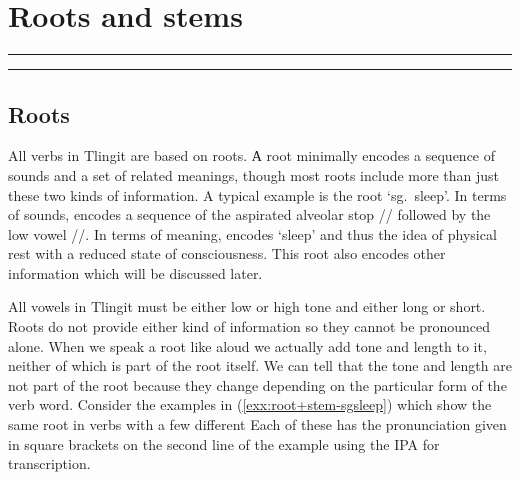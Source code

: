 
\resetexcnt
\chapter{Roots and stems}\label{ch:root+stem}

\startcontents[chapters]
\noindent\rule[0.5em]{\textwidth}{\heavyrulewidth}
\noindent\rule{\textwidth}{\heavyrulewidth}
\vspace{1\baselineskip}


\section{Roots}\label{sec:root+stem-roots}

All verbs in Tlingit are based on roots.
А root minimally encodes a sequence of sounds and a set of related meanings, though most roots include more than just these two kinds of information.
A typical example is the root  ‘sg.\ sleep’.
In terms of sounds,  encodes a sequence of the aspirated alveolar stop  // followed by the low vowel  //.
In terms of meaning,  encodes ‘sleep’ and thus the idea of physical rest with a reduced state of consciousness.
This root also encodes other information which will be discussed later.

All vowels in Tlingit must be either low or high tone and either long or short.
Roots do not provide either kind of information so they cannot be pronounced alone.
When we speak a root like  aloud we actually add tone and length to it, neither of which is part of the root itself.
We can tell that the tone and length are not part of the root because they change depending on the particular form of the verb word.
Consider the examples in (\ref{exx:root+stem-sgsleep}) which show the same root in verbs with a few different 
Each of these has the pronunciation given in square brackets on the second line of the example using the IPA for transcription.

